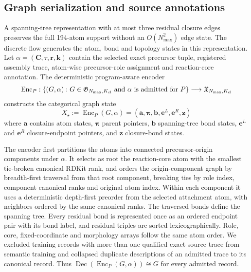 \documentclass{article}
\theoremstyle{definition}
\begin{document}
\subsection{Graph serialization and source annotations}
\label{app:graph-encoding}

A spanning-tree representation with at most three residual closure edges preserves the full
194-atom support without an $O(N_{\max}^2)$ edge state. The discrete flow generates the atom, bond
and topology states in this representation.
Let $\alpha=(\mathbf C,\tau,\mathbf r,\mathbf k)$ contain the selected exact precursor tuple,
registered assembly trace, atom-wise precursor-role assignment and reaction-core annotation. The deterministic
program-aware encoder
\begin{equation}
    \operatorname{Enc}_P:
    \{(G,\alpha):G\in\mathfrak G_{N_{\max},K_{\rm cl}}
      \text{ and }\alpha\text{ is admitted for }P\}
    \longrightarrow \mathfrak X_{N_{\max},K_{\rm cl}}
\end{equation}
constructs the categorical graph state
\begin{equation}
    X_\star:=\operatorname{Enc}_P(G,\alpha)=
    \left(
        \mathbf{a},
        \boldsymbol{\pi},
        \mathbf{b},
        \mathbf{e}^{L},
        \mathbf{e}^{R},
        \mathbf{z}
    \right)
\end{equation}
where $\mathbf{a}$ contains atom states, $\boldsymbol{\pi}$
parent pointers, $\mathbf{b}$ spanning-tree bond states, $\mathbf{e}^{L}$ and $\mathbf{e}^{R}$
closure-endpoint pointers, and $\mathbf{z}$ closure-bond states.

The encoder first partitions the atoms into connected precursor-origin components under $\alpha$.
It selects as root the reaction-core atom with the smallest tie-broken canonical RDKit rank, and
orders the origin-component graph by breadth-first traversal from that root component, breaking
ties by role index, component canonical ranks and original atom index. Within each component it uses
a deterministic depth-first preorder from the selected attachment atom, with neighbors ordered by
the same canonical ranks. The traversed bonds define the spanning tree. Every residual bond is
represented once as an ordered endpoint pair with its bond label, and residual triples are sorted
lexicographically. Role, core, fixed-coordinate and morphology arrays follow the
same atom order. We excluded training records with more than one qualified exact source trace
from semantic training and collapsed duplicate descriptions of an admitted trace to its canonical
record. Thus
$\operatorname{Dec}(\operatorname{Enc}_P(G,\alpha))\cong G$ for every admitted record.
\end{document}
